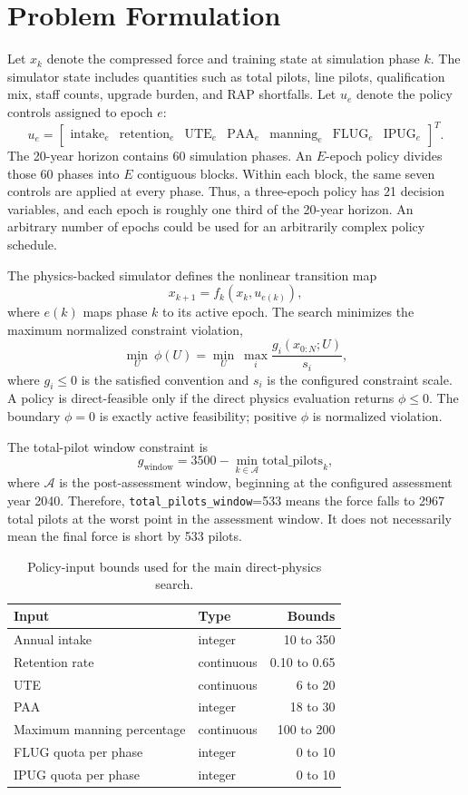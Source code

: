 \documentclass[10pt]{article}
\begin{document}
\section{Problem Formulation}

Let $x_k$ denote the compressed force and training state at simulation phase
$k$. The simulator state includes quantities such as total pilots, line pilots,
qualification mix, staff counts, upgrade burden, and RAP shortfalls. Let $u_e$
denote the policy controls assigned to epoch $e$:
\[
u_e =
\begin{bmatrix}
\text{intake}_e &
\text{retention}_e &
\text{UTE}_e &
\text{PAA}_e &
\text{manning}_e &
\text{FLUG}_e &
\text{IPUG}_e
\end{bmatrix}^{T}.
\]
The 20-year horizon contains 60 simulation phases. An $E$-epoch policy divides
those 60 phases into $E$ contiguous blocks. Within each block, the same seven
controls are applied at every phase. Thus, a three-epoch policy has 21 decision
variables, and each epoch is roughly one third of the 20-year horizon. An arbitrary
number of epochs could be used for an arbitrarily complex policy schedule.

The physics-backed simulator defines the nonlinear transition map
\[
  x_{k+1} = f_k(x_k,u_{e(k)}),
\]
where $e(k)$ maps phase $k$ to its active epoch. The search minimizes the
maximum normalized constraint violation,
\[
  \min_U \ \phi(U)
  = \min_U \ \max_i \frac{g_i(x_{0:N};U)}{s_i},
\]
where $g_i \le 0$ is the satisfied convention and $s_i$ is the configured
constraint scale. A policy is direct-feasible only if the direct physics
evaluation returns $\phi \le 0$. The boundary $\phi=0$ is exactly active
feasibility; positive $\phi$ is normalized violation.

The total-pilot window constraint is
\[
  g_{\mathrm{window}} =
  3500 - \min_{k \in \mathcal{A}} \mathrm{total\_pilots}_k ,
\]
where $\mathcal{A}$ is the post-assessment window, beginning at the configured
assessment year 2040. Therefore,
\texttt{total\_pilots\_window}=533 means the force falls to 2967 total pilots
at the worst point in the assessment window. It does not necessarily mean the
final force is short by 533 pilots.

\begin{table}[htbp]
\centering
\caption{Policy-input bounds used for the main direct-physics search.}
\label{tab:policy-bounds}
\begin{tabular}{llr}
\toprule
Input & Type & Bounds \\
\midrule
Annual intake & integer & 10 to 350 \\
Retention rate & continuous & 0.10 to 0.65 \\
UTE & continuous & 6 to 20 \\
PAA & integer & 18 to 30 \\
Maximum manning percentage & continuous & 100 to 200 \\
FLUG quota per phase & integer & 0 to 10 \\
IPUG quota per phase & integer & 0 to 10 \\
\bottomrule
\end{tabular}
\end{table}
\end{document}
